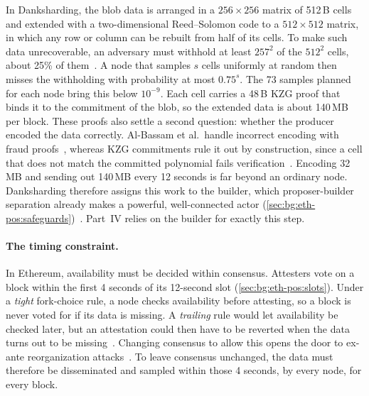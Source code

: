 In Danksharding, the blob data is arranged in a $256 \times 256$ matrix of 512\,B cells and extended with a two-dimensional Reed--Solomon code to a $512 \times 512$ matrix, in which any row or column can be rebuilt from half of its cells.
To make such data unrecoverable, an adversary must withhold at least $257^2$ of the $512^2$ cells, about 25\% of them~\cite{albassam2021fraud}.
A node that samples $s$ cells uniformly at random then misses the withholding with probability at most $0.75^{s}$.
The 73 samples planned for each node bring this below $10^{-9}$.  
Each cell carries a 48\,B KZG proof that binds it to the commitment of the blob, so the extended data is about 140\,MB per block.
These proofs also settle a second question: whether the producer encoded the data correctly.
Al-Bassam et al.\ handle incorrect encoding with fraud proofs~\cite{albassam2021fraud}, whereas KZG commitments rule it out by construction, since a cell that does not match the committed polynomial fails verification~\cite{kate2010kzg}.
Encoding 32\,MB and sending out 140\,MB every 12 seconds is far beyond an ordinary node.
Danksharding therefore assigns this work to the builder, which proposer-builder separation already makes a powerful, well-connected actor (\autoref{sec:bg:eth-pos:safeguards})~\cite{heimbach2023pbs,feist2022newsharding,ethdanksharding}.
Part~IV relies on the builder for exactly this step.

\paragraph{The timing constraint.}
In Ethereum, availability must be decided within consensus.
Attesters vote on a block within the first 4 seconds of its 12-second slot (\autoref{sec:bg:eth-pos:slots}).
Under a \emph{tight} fork-choice rule, a node checks availability before attesting, so a block is never voted for if its data is missing.
A \emph{trailing} rule would let availability be checked later, but an attestation could then have to be reverted when the data turns out to be missing~\cite{damato2024dasforkchoice}.
Changing consensus to allow this opens the door to ex-ante reorganization attacks~\cite{damato2024rlmd}.
To leave consensus unchanged, the data must therefore be disseminated and sampled within those 4 seconds, by every node, for every block.

